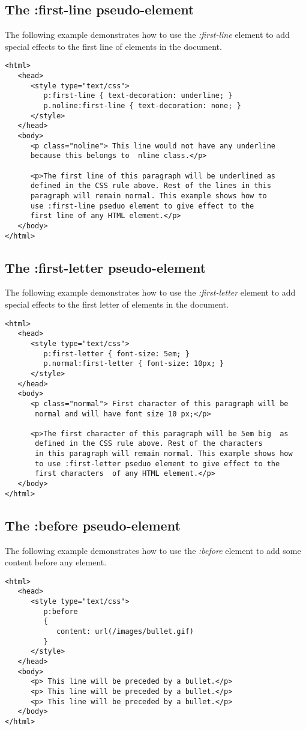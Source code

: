 \documentclass[a4paper,oneside]{book}
\numberwithin{equation}{chapter}
\begin{document}
\subsection{The :first-line pseudo-element}
The following example demonstrates how to use the \textit{:first-line} element to add special effects to the first line of elements in the document.
\begin{verbatim}
<html>
   <head>
      <style type="text/css">
         p:first-line { text-decoration: underline; }
         p.noline:first-line { text-decoration: none; }
      </style>
   </head>
   <body>
      <p class="noline"> This line would not have any underline 
      because this belongs to  nline class.</p>
      
      <p>The first line of this paragraph will be underlined as 
      defined in the CSS rule above. Rest of the lines in this 
      paragraph will remain normal. This example shows how to
      use :first-line pseduo element to give effect to the 
      first line of any HTML element.</p>
   </body>
</html>
\end{verbatim}
\subsection{The :first-letter pseudo-element}
The following example demonstrates how to use the \textit{:first-letter} element to add special effects to the first letter of elements in the document.
\begin{verbatim}
<html>
   <head>
      <style type="text/css">
         p:first-letter { font-size: 5em; }
         p.normal:first-letter { font-size: 10px; }
      </style>
   </head>
   <body>
      <p class="normal"> First character of this paragraph will be
       normal and will have font size 10 px;</p>
      
      <p>The first character of this paragraph will be 5em big  as
       defined in the CSS rule above. Rest of the characters
       in this paragraph will remain normal. This example shows how 
       to use :first-letter pseduo element to give effect to the 
       first characters  of any HTML element.</p>
   </body>
</html>
\end{verbatim}
\subsection{The :before pseudo-element}
The following example demonstrates how to use the \textit{:before} element to add some content before any element.
\begin{verbatim}
<html>
   <head>
      <style type="text/css">
         p:before
         {
            content: url(/images/bullet.gif)
         }
      </style>
   </head>
   <body>
      <p> This line will be preceded by a bullet.</p>
      <p> This line will be preceded by a bullet.</p>
      <p> This line will be preceded by a bullet.</p>
   </body>
</html>
\end{verbatim}
\end{document}
